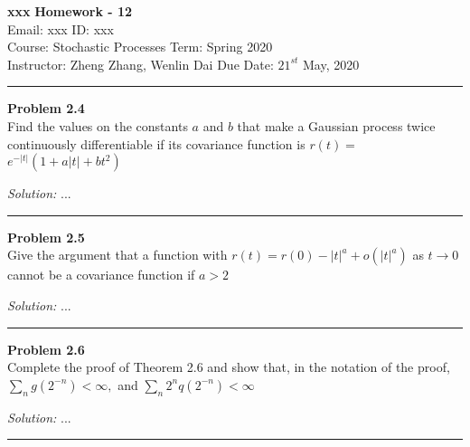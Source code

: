 \documentclass[a4paper, 11pt]{article}
\newenvironment{problem}[2][Problem]
    { \begin{mdframed}[backgroundcolor=gray!20] \textbf{#1 #2} \\}
    {  \end{mdframed}}
\newenvironment{solution}
    {\textit{Solution:}}
    {}
\begin{document}
\noindent
\large\textbf{xxx} \hfill \textbf{Homework - 12}   \\
Email: xxx \hfill ID: xxx \\
\normalsize Course: Stochastic Processes \hfill Term: Spring 2020\\
Instructor: Zheng Zhang, Wenlin Dai \hfill Due Date: $21^{st}$ May, 2020 \\
\noindent\rule{7in}{2.8pt}

\begin{problem}{2.4}
Find the values on the constants $a$ and $b$ that make a Gaussian process twice continuously differentiable if its covariance function is $r(t)=$ $e^{-|t|}\left(1+a|t|+b t^{2}\right)$
\end{problem}
\begin{solution}
...
\end{solution} 

\noindent\rule{7in}{2.8pt}


\begin{problem}{2.5}
Give the argument that a function with $r(t)=r(0)-|t|^{a}+o\left(|t|^{a}\right)$ as $t \rightarrow 0$ cannot be a covariance function if $a>2$
\end{problem}
\begin{solution}
	...
\end{solution} 

\noindent\rule{7in}{2.8pt}


\begin{problem}{2.6}
Complete the proof of Theorem 2.6 and show that, in the notation of the proof, $\sum_{n} g\left(2^{-n}\right)<\infty,$ and $\sum_{n} 2^{n} q\left(2^{-n}\right)<\infty$
\end{problem}
\begin{solution}
	...
\end{solution} 

\noindent\rule{7in}{2.8pt}
\end{document}
